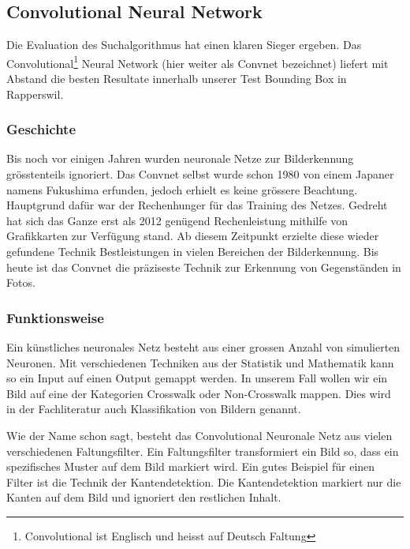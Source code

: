 \subsection{Convolutional Neural Network}
Die Evaluation des Suchalgorithmus hat einen klaren Sieger ergeben. Das Convolutional\footnote{Convolutional ist Englisch und heisst auf Deutsch Faltung} Neural Network (hier weiter als Convnet bezeichnet) liefert mit Abstand die besten Resultate innerhalb unserer Test \Gls{Bounding Box} in Rapperswil.

\subsubsection{Geschichte}
Bis noch vor einigen Jahren wurden neuronale Netze zur Bilderkennung grösstenteils ignoriert. Das Convnet selbst wurde schon 1980 von einem Japaner namens Fukushima erfunden, jedoch erhielt es keine grössere Beachtung. Hauptgrund dafür war der Rechenhunger für das Training des Netzes. Gedreht hat sich das Ganze erst als 2012 genügend Rechenleistung mithilfe von Grafikkarten zur Verfügung stand. Ab diesem Zeitpunkt erzielte diese wieder gefundene Technik Bestleistungen in vielen Bereichen der Bilderkennung. Bis heute ist das Convnet die präziseste Technik zur Erkennung von Gegenständen in Fotos.

\subsubsection{Funktionsweise}
Ein künstliches neuronales Netz besteht aus einer grossen Anzahl von simulierten Neuronen. Mit verschiedenen Techniken aus der Statistik und  Mathematik kann so ein Input auf einen Output gemappt werden. In unserem Fall wollen wir ein Bild auf eine der Kategorien Crosswalk oder Non-Crosswalk mappen. Dies wird in der Fachliteratur auch Klassifikation von Bildern genannt.

Wie der Name schon sagt, besteht das Convolutional Neuronale Netz aus vielen verschiedenen Faltungsfilter. Ein Faltungsfilter transformiert ein Bild so, dass ein spezifisches Muster auf dem Bild markiert wird. Ein gutes Beispiel für einen Filter ist die Technik der Kantendetektion. Die Kantendetektion markiert nur die Kanten auf dem Bild und ignoriert den restlichen Inhalt.\\

